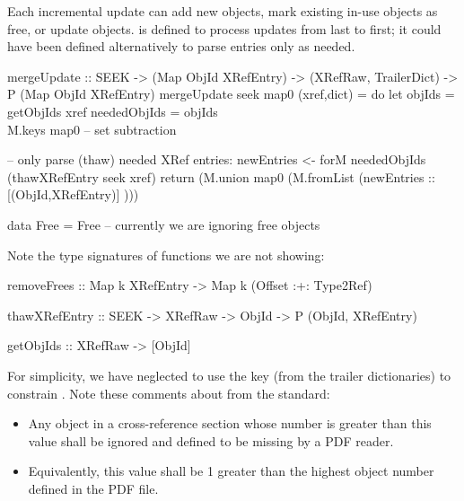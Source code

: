 Each incremental update can add new objects, mark existing in-use objects as free, or update objects.
%
 is defined to process updates from last to first;
%
it could have been defined alternatively to parse \xref{} entries only as needed.
%

\begin{code}
mergeUpdate :: SEEK
            ->  (Map ObjId XRefEntry)
            -> (XRefRaw, TrailerDict)
            -> P (Map ObjId XRefEntry)
mergeUpdate seek map0 (xref,dict) =
    do
    let objIds       = getObjIds xref
        neededObjIds = objIds \\ M.keys map0
                       -- set subtraction

    -- only parse (thaw) needed XRef entries:
    newEntries <- forM neededObjIds
                       (thawXRefEntry seek xref)
    return (M.union map0 (M.fromList (newEntries :: [(ObjId,XRefEntry)] )))

data Free = Free  -- currently we are ignoring free objects
\end{code}
Note the type signatures of functions we are not showing:
\begin{code}
removeFrees :: Map k XRefEntry -> Map k (Offset :+: Type2Ref)

thawXRefEntry :: SEEK -> XRefRaw -> ObjId -> P (ObjId, XRefEntry)

getObjIds :: XRefRaw -> [ObjId]
\end{code}

For simplicity, we have neglected to use the  key (from
the trailer dictionaries) to constrain \objids{}.  Note these comments
about  from the standard:
\begin{itemize}
  \item Any object in a cross-reference section whose number is
    greater than this value shall be ignored and defined to be missing
    by a PDF reader.
  \item Equivalently, this value shall be 1 greater than the highest
    object number defined in the PDF file.
\end{itemize}

